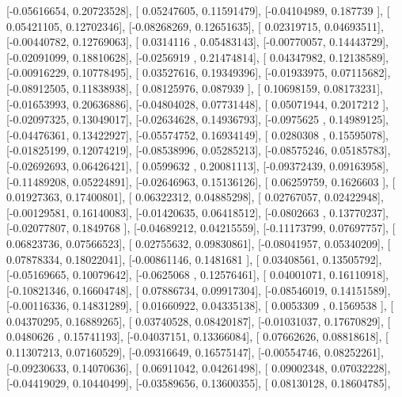 \documentclass{article}
\begin{document}
       [-0.05616654,  0.20723528],
       [ 0.05247605,  0.11591479],
       [-0.04104989,  0.187739  ],
       [ 0.05421105,  0.12702346],
       [-0.08268269,  0.12651635],
       [ 0.02319715,  0.04693511],
       [-0.00440782,  0.12769063],
       [ 0.0314116 ,  0.05483143],
       [-0.00770057,  0.14443729],
       [-0.02091099,  0.18810628],
       [-0.0256919 ,  0.21474814],
       [ 0.04347982,  0.12138589],
       [-0.00916229,  0.10778495],
       [ 0.03527616,  0.19349396],
       [-0.01933975,  0.07115682],
       [-0.08912505,  0.11838938],
       [ 0.08125976,  0.087939  ],
       [ 0.10698159,  0.08173231],
       [-0.01653993,  0.20636886],
       [-0.04804028,  0.07731448],
       [ 0.05071944,  0.2017212 ],
       [-0.02097325,  0.13049017],
       [-0.02634628,  0.14936793],
       [-0.0975625 ,  0.14989125],
       [-0.04476361,  0.13422927],
       [-0.05574752,  0.16934149],
       [ 0.0280308 ,  0.15595078],
       [-0.01825199,  0.12074219],
       [-0.08538996,  0.05285213],
       [-0.08575246,  0.05185783],
       [-0.02692693,  0.06426421],
       [ 0.0599632 ,  0.20081113],
       [-0.09372439,  0.09163958],
       [-0.11489208,  0.05224891],
       [-0.02646963,  0.15136126],
       [ 0.06259759,  0.1626603 ],
       [ 0.01927363,  0.17400801],
       [ 0.06322312,  0.04885298],
       [ 0.02767057,  0.02422948],
       [-0.00129581,  0.16140083],
       [-0.01420635,  0.06418512],
       [-0.0802663 ,  0.13770237],
       [-0.02077807,  0.1849768 ],
       [-0.04689212,  0.04215559],
       [-0.11173799,  0.07697757],
       [ 0.06823736,  0.07566523],
       [ 0.02755632,  0.09830861],
       [-0.08041957,  0.05340209],
       [ 0.07878334,  0.18022041],
       [-0.00861146,  0.1481681 ],
       [ 0.03408561,  0.13505792],
       [-0.05169665,  0.10079642],
       [-0.0625068 ,  0.12576461],
       [ 0.04001071,  0.16110918],
       [-0.10821346,  0.16604748],
       [ 0.07886734,  0.09917304],
       [-0.08546019,  0.14151589],
       [-0.00116336,  0.14831289],
       [ 0.01660922,  0.04335138],
       [ 0.0053309 ,  0.1569538 ],
       [ 0.04370295,  0.16889265],
       [ 0.03740528,  0.08420187],
       [-0.01031037,  0.17670829],
       [ 0.0480626 ,  0.15741193],
       [-0.04037151,  0.13366084],
       [ 0.07662626,  0.08818618],
       [ 0.11307213,  0.07160529],
       [-0.09316649,  0.16575147],
       [-0.00554746,  0.08252261],
       [-0.09230633,  0.14070636],
       [ 0.06911042,  0.04261498],
       [ 0.09002348,  0.07032228],
       [-0.04419029,  0.10440499],
       [-0.03589656,  0.13600355],
       [ 0.08130128,  0.18604785],
\end{document}
